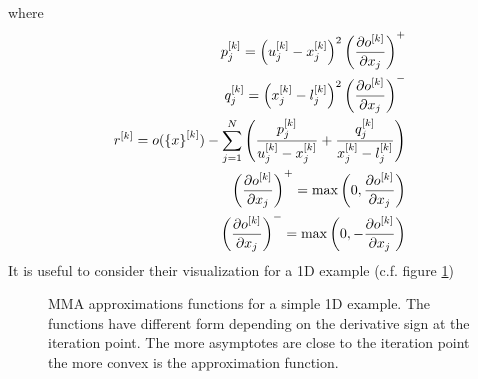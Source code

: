 where 
\begin{eqnarray}
\label{eq.2.13}
p_j^{[k]}=\left(u_j^{[k]}-x_j^{[k]}\right)^2\left(\frac{\partial o^{[k]}}{\partial x_j}\right)^+\\
\label{eq.2.14}
q_j^{[k]}=\left(x_j^{[k]}-l_j^{[k]}\right)^2\left(\frac{\partial o^{[k]}}{\partial x_j}\right)^-\\
r^{[k]}=o(\left\lbrace{x}\right \rbrace^{[k]})-\sum_{j=1}^N\left(\frac{p_j^{[k]}}{u_j^{[k]}-x^{[k]}_j}+\frac{q_j^{[k]}}{x^{[k]}_j-l_j^{[k]}}\right)\\
\left(\frac{\partial o^{[k]}}{\partial x_j}\right)^+=\max\left(0,\frac{\partial o^{[k]}}{\partial x_j}\right)\\
\left(\frac{\partial o^{[k]}}{\partial x_j}\right)^-=\max\left(0,-\frac{\partial o^{[k]}}{\partial x_j}\right)
\end{eqnarray}
It is useful to consider their visualization for a 1D example (c.f. figure \ref{fig.2.1c})
\begin{figure}[hbt!]
  \centering
       \caption{MMA approximations functions for a simple 1D example. The functions have different form depending on the derivative sign at the iteration point. The more asymptotes are close to the iteration point the more convex is the approximation function.}
       \label{fig.2.1c}
     \end{figure}
